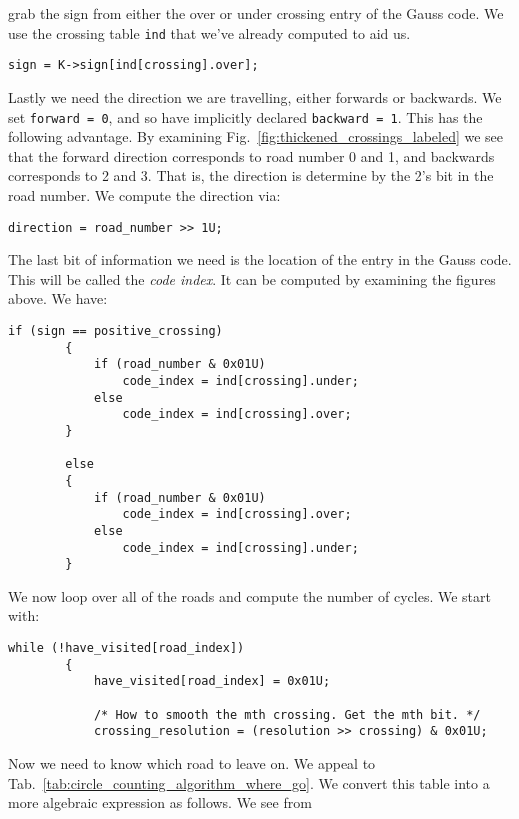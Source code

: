        grab the sign from either the over or under crossing entry of the Gauss
        code. We use the crossing table \texttt{ind} that we've already computed
        to aid us.
\begin{lstlisting}[style=CStyle, firstnumber = 44]
        sign = K->sign[ind[crossing].over];
\end{lstlisting}
        Lastly we need the direction we are travelling, either forwards or
        backwards. We set \texttt{forward = 0}, and so have implicitly
        declared \texttt{backward = 1}. This has the following advantage. By
        examining Fig.~\ref{fig:thickened_crossings_labeled} we see that the
        forward direction corresponds to road number 0 and 1, and backwards
        corresponds to 2 and 3. That is, the direction is determine by the
        2's bit in the road number. We compute the direction via:
\begin{lstlisting}[style=CStyle, firstnumber = 46]
        direction = road_number >> 1U;
\end{lstlisting}
        The last bit of information we need is the location of the entry in the
        Gauss code. This will be called the \textit{code index}. It can be
        computed by examining the figures above. We have:
\begin{lstlisting}[style=CStyle, firstnumber = 48]
        if (sign == positive_crossing)
        {
            if (road_number & 0x01U)
                code_index = ind[crossing].under;
            else
                code_index = ind[crossing].over;
        }

        else
        {
            if (road_number & 0x01U)
                code_index = ind[crossing].over;
            else
                code_index = ind[crossing].under;
        }
\end{lstlisting}
        We now loop over all of the roads and compute the number of cycles. We
        start with:
\begin{lstlisting}[style=CStyle, firstnumber = 64]
        while (!have_visited[road_index])
        {
            have_visited[road_index] = 0x01U;

            /* How to smooth the mth crossing. Get the mth bit. */
            crossing_resolution = (resolution >> crossing) & 0x01U;
\end{lstlisting}
        Now we need to know which road to leave on. We appeal to
        Tab.~\ref{tab:circle_counting_algorithm_where_go}. We convert this table
        into a more algebraic expression as follows. We see from

